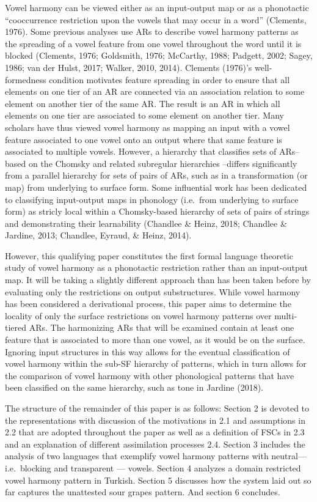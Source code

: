 \documentclass[,doc,floatsintext]{apa6}
\theoremstyle{definition}
\theoremstyle{definition}
\theoremstyle{definition}
\theoremstyle{remark}
\begin{document}
Vowel harmony can be viewed either as an input-output map or as a
phonotactic \enquote{cooccurrence restriction upon the vowels that may
occur in a word} (Clements, 1976). Some previous analyses use ARs to
describe vowel harmony patterns as the spreading of a vowel feature from
one vowel throughout the word until it is blocked (Clements, 1976;
Goldsmith, 1976; McCarthy, 1988; Padgett, 2002; Sagey, 1986; van der
Hulst, 2017; Walker, 2010, 2014). Clements (1976)'s well-formedness
condition motivates feature spreading in order to ensure that all
elements on one tier of an AR are connected via an association relation
to some element on another tier of the same AR. The result is an AR in
which all elements on one tier are associated to some element on another
tier. Many scholars have thus viewed vowel harmony as mapping an input
with a vowel feature associated to one vowel onto an output where that
same feature is associated to multiple vowels. However, a hierarchy that
classifies sets of ARs-- based on the Chomsky and related subregular
hierarchies --differs significantly from a parallel hierarchy for sets
of pairs of ARs, such as in a transformation (or map) from underlying to
surface form. Some influential work has been dedicated to classifying
input-output maps in phonology (i.e.~from underlying to surface form) as
stricly local within a Chomsky-based hierarchy of sets of pairs of
strings and demonstrating their learnability (Chandlee \& Heinz, 2018;
Chandlee \& Jardine, 2013; Chandlee, Eyraud, \& Heinz, 2014).

However, this qualifying paper constitutes the first formal language
theoretic study of vowel harmony as a phonotactic restriction rather
than an input-output map. It will be taking a slightly different
approach than has been taken before by evaluating only the restrictions
on output substructures. While vowel harmony has been considered a
derivational process, this paper aims to determine the locality of only
the surface restrictions on vowel harmony patterns over multi-tiered
ARs. The harmonizing ARs that will be examined contain at least one
feature that is associated to more than one vowel, as it would be on the
surface. Ignoring input structures in this way allows for the eventual
classification of vowel harmony within the sub-SF hierarchy of patterns,
which in turn allows for the comparison of vowel harmony with other
phonological patterns that have been classified on the same hierarchy,
such as tone in Jardine (2018).

The structure of the remainder of this paper is as follows: Section 2 is
devoted to the representations with discussion of the motivations in 2.1
and assumptions in 2.2 that are adopted throughout the paper as well as
a definition of FSCs in 2.3 and an explanation of different assimilation
processes 2.4. Section 3 includes the analysis of two languages that
exemplify vowel harmony patterns with neutral--- i.e.~blocking and
transparent --- vowels. Section 4 analyzes a domain restricted vowel
harmony pattern in Turkish. Section 5 discusses how the system laid out
so far captures the unattested sour grapes pattern. And section 6
concludes.
\end{document}
